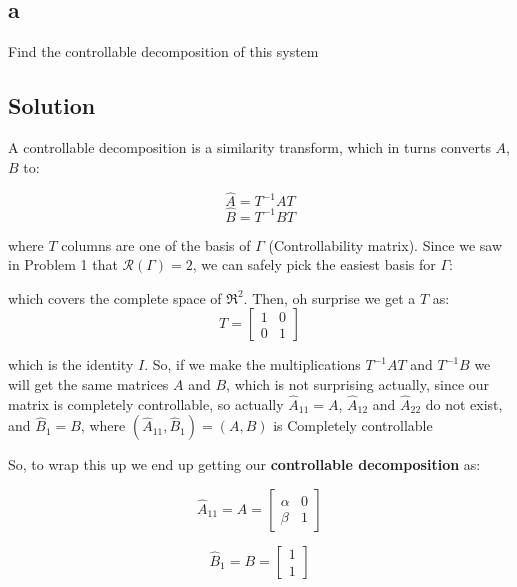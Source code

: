 \documentclass[10pt,a4paper]{article}
\begin{document}
\subsection*{a}
Find the controllable decomposition of this system

\subsection*{Solution}
A controllable decomposition is a similarity transform, which in turns converts $A$, $B$ to:

\[ \hat{A} = T^{-1}AT \]
\[ \hat{B} = T^{-1}BT \]

where $T$ columns are one of the basis of $\Gamma$ (Controllability matrix). Since we saw in Problem 1 that $\mathcal{R}(\Gamma) = 2$, we can safely pick the easiest basis for $\Gamma$:

\begin{center}
\end{center}
 

which covers the complete space of $\Re^{2}$. Then, oh surprise we get a $T$ as:
\[
T = 
\begin{bmatrix}
1 & 0 \\
0 & 1
\end{bmatrix}
\]

which is the identity $I$. So, if we make the multiplications $T^{-1}AT$ and $T^{-1}B$ we will get the same matrices $A$ and $B$, which is not surprising actually, since our matrix is completely controllable, so actually $\hat{A}_{11} = A$, $\hat{A}_{12}$  and $\hat{A}_{22}$ do not exist, and $\hat{B}_{1} = B$, where $(\hat{A}_{11}, \hat{B}_{1}) = (A,B)$ is Completely controllable
\medskip

So, to wrap this up we end up getting our \textbf{controllable decomposition} as:

\[ \hat{A}_{11} = A =
\begin{bmatrix}
\alpha & 0 \\
\beta & 1
\end{bmatrix}
\]

\[ \hat{B}_{1} = B =
\begin{bmatrix}
1 \\
1
\end{bmatrix}
\]
\end{document}
